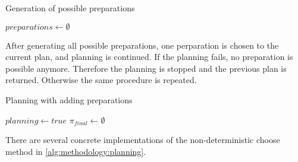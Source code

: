 \begin{algorithm}
    \caption{Generation of possible preparations}
    \label{alg:methodology:preparations}
    $preparations \leftarrow \emptyset$\;
\end{algorithm}

After generating all possible preparations, one perparation is chosen to the current plan, and planning is continued.
If the planning fails, no preparation is possible anymore.
Therefore the planning is stopped and the previous plan is returned.
Otherwise the same procedure is repeated.

\begin{algorithm}
    \caption{Planning with adding preparations}
    \label{alg:methodology:planning}
    \KwOut{$\pi$}
    $planning \leftarrow true$\;
    $\pi_{final} \leftarrow \emptyset$\;
\end{algorithm}

There are several concrete implementations of the non-deterministic choose method in \ref{alg:methodology:planning}.

